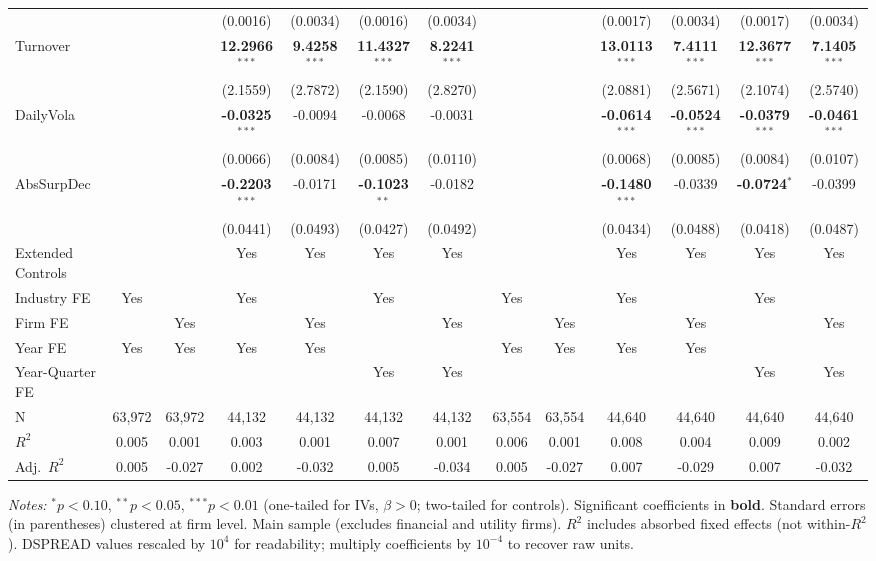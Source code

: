 \documentclass[11pt,a4paper]{article}
\begin{document}
\begin{table}[htbp]
\begin{tabular}{lcccccccccccc}
 &  &  & (0.0016) & (0.0034) & (0.0016) & (0.0034) &  &  & (0.0017) & (0.0034) & (0.0017) & (0.0034) \\
Turnover &  &  & \textbf{12.2966}$^{***}$ & \textbf{9.4258}$^{***}$ & \textbf{11.4327}$^{***}$ & \textbf{8.2241}$^{***}$ &  &  & \textbf{13.0113}$^{***}$ & \textbf{7.4111}$^{***}$ & \textbf{12.3677}$^{***}$ & \textbf{7.1405}$^{***}$ \\
 &  &  & (2.1559) & (2.7872) & (2.1590) & (2.8270) &  &  & (2.0881) & (2.5671) & (2.1074) & (2.5740) \\
DailyVola &  &  & \textbf{-0.0325}$^{***}$ & -0.0094 & -0.0068 & -0.0031 &  &  & \textbf{-0.0614}$^{***}$ & \textbf{-0.0524}$^{***}$ & \textbf{-0.0379}$^{***}$ & \textbf{-0.0461}$^{***}$ \\
 &  &  & (0.0066) & (0.0084) & (0.0085) & (0.0110) &  &  & (0.0068) & (0.0085) & (0.0084) & (0.0107) \\
AbsSurpDec &  &  & \textbf{-0.2203}$^{***}$ & -0.0171 & \textbf{-0.1023}$^{**}$ & -0.0182 &  &  & \textbf{-0.1480}$^{***}$ & -0.0339 & \textbf{-0.0724}$^{*}$ & -0.0399 \\
 &  &  & (0.0441) & (0.0493) & (0.0427) & (0.0492) &  &  & (0.0434) & (0.0488) & (0.0418) & (0.0487) \\
\midrule
Extended Controls &  &  & Yes & Yes & Yes & Yes &  &  & Yes & Yes & Yes & Yes \\
Industry FE & Yes &  & Yes &  & Yes &  & Yes &  & Yes &  & Yes &  \\
Firm FE &  & Yes &  & Yes &  & Yes &  & Yes &  & Yes &  & Yes \\
Year FE & Yes & Yes & Yes & Yes &  &  & Yes & Yes & Yes & Yes &  &  \\
Year-Quarter FE &  &  &  &  & Yes & Yes &  &  &  &  & Yes & Yes \\
\midrule
N & 63,972 & 63,972 & 44,132 & 44,132 & 44,132 & 44,132 & 63,554 & 63,554 & 44,640 & 44,640 & 44,640 & 44,640 \\
$R^2$ & 0.005 & 0.001 & 0.003 & 0.001 & 0.007 & 0.001 & 0.006 & 0.001 & 0.008 & 0.004 & 0.009 & 0.002 \\
Adj.~$R^2$ & 0.005 & -0.027 & 0.002 & -0.032 & 0.005 & -0.034 & 0.005 & -0.027 & 0.007 & -0.029 & 0.007 & -0.032 \\
\bottomrule
\end{tabular}
\begin{minipage}{\linewidth}
\vspace{2pt}\scriptsize
\textit{Notes:} $^{*}p<0.10$, $^{**}p<0.05$, $^{***}p<0.01$ (one-tailed for IVs, $\beta > 0$; two-tailed for controls).
 Significant coefficients in \textbf{bold}.
 Standard errors (in parentheses) clustered at firm level.
 Main sample (excludes financial and utility firms).
 $R^2$ includes absorbed fixed effects (not within-$R^2$).
 DSPREAD values rescaled by $10^4$ for readability; multiply coefficients by $10^{-4}$ to recover raw units.
\end{minipage}
\end{table}
\end{document}
